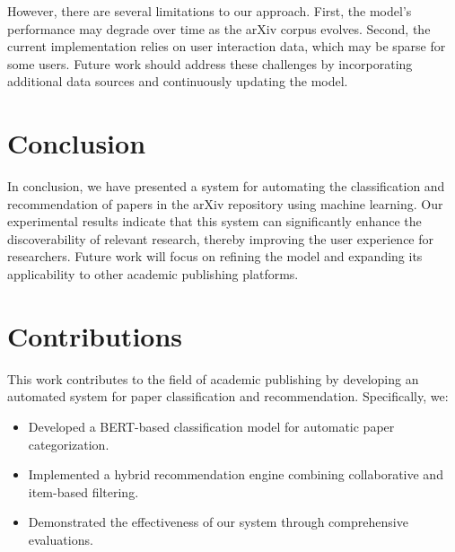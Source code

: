 \documentclass{article}
\begin{document}
However, there are several limitations to our approach. First, the model's performance may degrade over time as the arXiv corpus evolves. Second, the current implementation relies on user interaction data, which may be sparse for some users. Future work should address these challenges by incorporating additional data sources and continuously updating the model.

\section{Conclusion}
In conclusion, we have presented a system for automating the classification and recommendation of papers in the arXiv repository using machine learning. Our experimental results indicate that this system can significantly enhance the discoverability of relevant research, thereby improving the user experience for researchers. Future work will focus on refining the model and expanding its applicability to other academic publishing platforms.

\section{Contributions}
This work contributes to the field of academic publishing by developing an automated system for paper classification and recommendation. Specifically, we:
\begin{itemize}
    \item Developed a BERT-based classification model for automatic paper categorization.
    \item Implemented a hybrid recommendation engine combining collaborative and item-based filtering.
    \item Demonstrated the effectiveness of our system through comprehensive evaluations.
\end{itemize}



\end{document}
